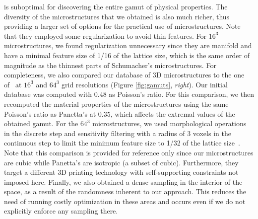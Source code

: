 is suboptimal for discovering the entire gamut of physical properties.
The diversity of the microstructures that we obtained is also much richer,
thus providing a larger set of options for the practical use of microstructures.
Note that they employed some regularization to avoid thin features.
For $16^3$ microstructures, we found regularization unnecessary since they are manifold and have a minimal feature size of 1/16 of the lattice size, 
which is the same order of magnitude as the thinnest parts of Schumacher's microstructures.
For completeness, we also compared our database of 3D microstructures to the one of~\citet{Panetta:2015} at $16^3$ and $64^3$ grid resolutions (Figure \ref{fig:gamuts}, \emph{right}).
Our initial database was computed with $0.48$ as Poisson's ratio.
For this comparison, we then recomputed the material properties of the microstructures using the same Poisson's ratio as Panetta's at $0.35$,
which affects the extremal values of the obtained gamut.
For the $64^3$ microstructures, we used morphological operations in the discrete step and sensitivity filtering with a radius of 3 voxels in the continuous step to limit the minimum feature size to 1/32 of the lattice size~\citep{sigmund:2007}.
Note that this comparison is provided for reference only since our microstructures are cubic while Panetta's are isotropic (a subset of cubic).
Furthermore, they target a different 3D printing technology with self-supporting constraints not imposed here.
Finally, we also obtained a dense sampling in the interior of the space, as a result of the randomness inherent to our approach. This reduces the need of running costly optimization in these areas and occurs even if we do not explicitly enforce any sampling there.

